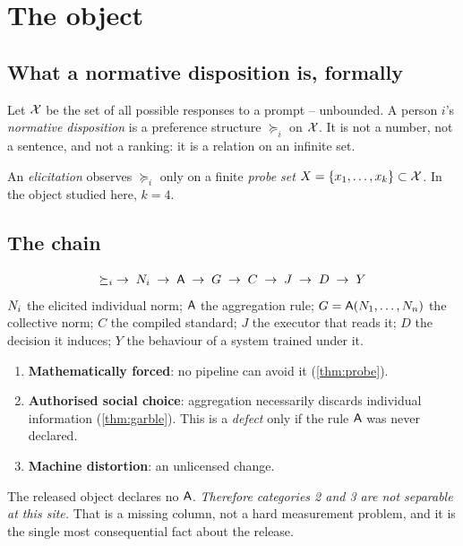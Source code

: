 \section{The object}
\label{sec:object}

\subsection{What a normative disposition is, formally}

\begin{definition}[Disposition]
Let $\mathcal{X}$ be the set of all possible responses to a prompt -- unbounded. A
person $i$'s \emph{normative disposition} is a preference structure $\succeq_i$
on $\mathcal{X}$. It is not a number, not a sentence, and not a ranking: it is a
relation on an infinite set.
\end{definition}

\begin{definition}[Elicitation]
An \emph{elicitation} observes $\succeq_i$ only on a finite \emph{probe set}
$X = \{x_1,\dots,x_k\} \subset \mathcal{X}$. In the object studied here, $k=4$.
\end{definition}

\subsection{The chain}

\begin{equation}
\succeq_i \;\to\; N_i \;\to\; \mathsf{A} \;\to\; G \;\to\; C \;\to\; J \;\to\; D \;\to\; Y
\label{eq:chain}
\end{equation}
\noindent
$N_i$ the elicited individual norm; $\mathsf{A}$ the aggregation rule; $G=\mathsf{A}(N_1,\dots,N_n)$
the collective norm; $C$ the compiled standard; $J$ the executor that reads it;
$D$ the decision it induces; $Y$ the behaviour of a system trained under it.

\begin{remark}
\label{rem:threelosses}
\begin{enumerate}
\item \textbf{Mathematically forced}: no pipeline can avoid it (\cref{thm:probe}).
\item \textbf{Authorised social choice}: aggregation necessarily discards
      individual information (\cref{thm:garble}). This is a \emph{defect} only if
      the rule $\mathsf{A}$ was never declared.
\item \textbf{Machine distortion}: an unlicensed change.
\end{enumerate}
The released object declares no $\mathsf{A}$. \emph{Therefore categories 2 and 3 are
not separable at this site.} That is a missing column, not a hard measurement
problem, and it is the single most consequential fact about the release.
\end{remark}


